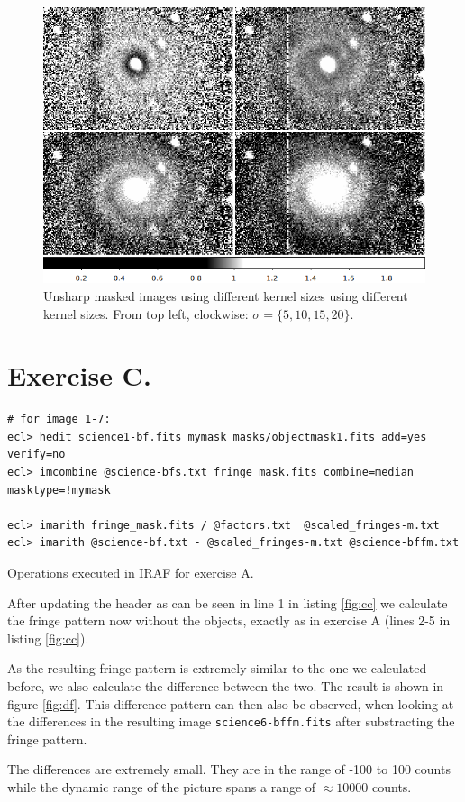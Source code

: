 \documentclass[11pt,a4paper,twoside]{article}
\begin{document}
\begin{figure}
\centering
\includegraphics[width=\linewidth]{./pic/gauss}
\caption{   Unsharp masked images using different kernel sizes using different kernel sizes.
            From top left, clockwise: $\sigma= \{5,10,15,20\}$.}
\label{fig:gs}
\end{figure}

\section*{Exercise C.}

\begin{listing}[h!]
\begin{verbatim}
# for image 1-7:
ecl> hedit science1-bf.fits mymask masks/objectmask1.fits add=yes verify=no
ecl> imcombine @science-bfs.txt fringe_mask.fits combine=median masktype=!mymask

ecl> imarith fringe_mask.fits / @factors.txt  @scaled_fringes-m.txt
ecl> imarith @science-bf.txt - @scaled_fringes-m.txt @science-bffm.txt
\end{verbatim}
\caption{Operations executed in IRAF for exercise A.}
\label{fig:cc}
\end{listing}

After updating the header as can be seen in line 1 in listing \ref{fig:cc}
we calculate the fringe pattern now without the objects, exactly as in 
exercise A (lines 2-5 in listing \ref{fig:cc}).

As the resulting fringe pattern is extremely similar to the one we calculated
before, we also calculate the difference between the two. The result is shown
in figure \ref{fig:df}. This difference pattern can then also be observed, when
looking at the differences in the resulting image \verb+science6-bffm.fits+
after substracting the fringe pattern.

The differences are extremely small. They are in the range of -100 to 100 counts
while the dynamic range of the picture spans a range of $\approx 10000$ counts.
\end{document}
